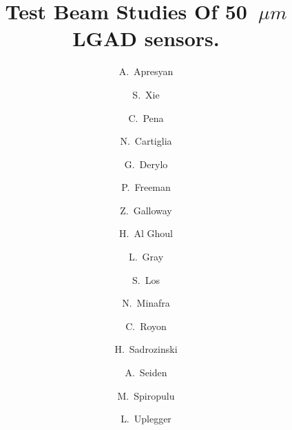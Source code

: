 \documentclass[preprint,1p]{elsarticle}
\begin{document}
\linenumbers

\begin{frontmatter}



\title{Test Beam Studies Of 50~$\mu m$ LGAD sensors.}


\author[1]{A.~Apresyan}
\author[2]{S.~Xie}
\author[2]{C.~Pena}
\author[5]{N.~Cartiglia}
\author[1]{G.~Derylo}
\author[4]{P.~Freeman}
\author[4]{Z.~Galloway}
\author[3]{H.~Al Ghoul}
\author[1]{L.~Gray}
\author[1]{S.~Los}
\author[3]{N.~Minafra}
\author[3]{C.~Royon}
\author[4]{H.~Sadrozinski}
\author[4]{A.~Seiden}
\author[2]{M.~Spiropulu}
\author[1]{L.~Uplegger}

\address[1]{Fermi National Accelerator Laboratory, Batavia, IL, USA}
\address[2]{California Institute of Technology, Pasadena, CA, USA}
\address[3]{University of Kansas, KS, USA}
\address[4]{SCIPP, University of California Santa Cruz, CA, USA}
\address[5]{Università di Torino, Torino, Italy}



\end{frontmatter}
\end{document}
